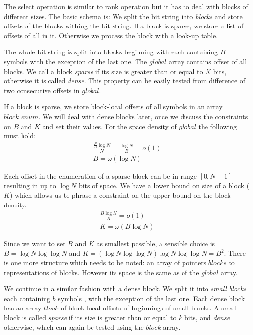 The select operation is similar to rank operation but it has to deal with blocks of different sizes.
The basic schema is:
We split the bit string into \emph{blocks} and store offsets of the blocks withing the bit string.
If a block is sparse, we store a list of offsets of all \ph{} in it.
Otherwise we process the block with a look-up table.

The whole bit string is split into blocks beginning with \ph{} each containing $B$ symbols \ph{} with the exception of the last one.
The $global$ array contains offset of all blocks.
We call a block \emph{sparse} if its size is greater than or equal to $K$ bits, otherwise it is called \emph{dense}.
This property can be easily tested from difference of two consecutive offsets in $global$.

If a block is sparse, we store block-local offsets of all symbols \ph{} in an array $block\_enum$.
We will deal with dense blocks later, once we discuss the constraints on $B$ and $K$ and set their values.
For the space density of $global$ the following must hold:
\begin{gather*}
\frac{\frac{N}{B} \log N}{N} = \frac{\log N}{B} = o(1) \\
B = \omega(\log N)
\end{gather*}

Each offset in the enumeration of a sparse block can be in range $[0, N-1]$ resulting in up to $\log N$ bits of space.
We have a lower bound on size of a block ($K$) which allows us to phrase a constraint on the upper bound on the block density.
\begin{gather*}
\frac{B \log N}{K} = o(1) \\
K = \omega(B \log N)
\end{gather*}

Since we want to set $B$ and $K$ as smallest possible, a sensible choice is $B = \log N \log \log N$ and $K = (\log N \log \log N) \log N \log \log N = B^2 $.
There is one more structure which needs to be noted: an array of pointers $blocks$ to representations of blocks.
However its space is the same as of the $global$ array.

We continue in a similar fashion with a dense block.
We split it into \emph{small blocks} each containing $b$ symbols \ph, with the exception of the last one.
Each dense block has an array $block$ of block-local offsets of beginnings of small blocks.
A small block is called \emph{sparse} if its size is greater than or equal to $k$ bits, and \emph{dense} otherwise, which can again be tested using the $block$ array.

